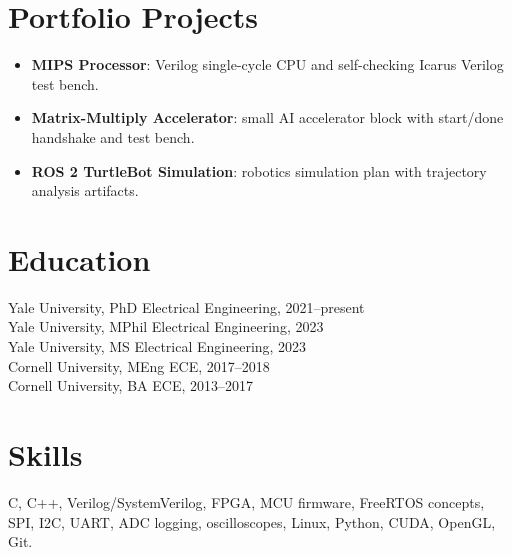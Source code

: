 \documentclass[10pt]{article}
\begin{document}
\section{Portfolio Projects}
\begin{itemize}
\item \textbf{MIPS Processor}: Verilog single-cycle CPU and self-checking
Icarus Verilog test bench.
\item \textbf{Matrix-Multiply Accelerator}: small AI accelerator block with
start/done handshake and test bench.
\item \textbf{ROS 2 TurtleBot Simulation}: robotics simulation plan with
trajectory analysis artifacts.
\end{itemize}
\section{Education}
Yale University, PhD Electrical Engineering, 2021--present\\
Yale University, MPhil Electrical Engineering, 2023\\
Yale University, MS Electrical Engineering, 2023\\
Cornell University, MEng ECE, 2017--2018\\
Cornell University, BA ECE, 2013--2017
\section{Skills}
C, C++, Verilog/SystemVerilog, FPGA, MCU firmware, FreeRTOS concepts, SPI,
I2C, UART, ADC logging, oscilloscopes, Linux, Python, CUDA, OpenGL, Git.
\end{document}
